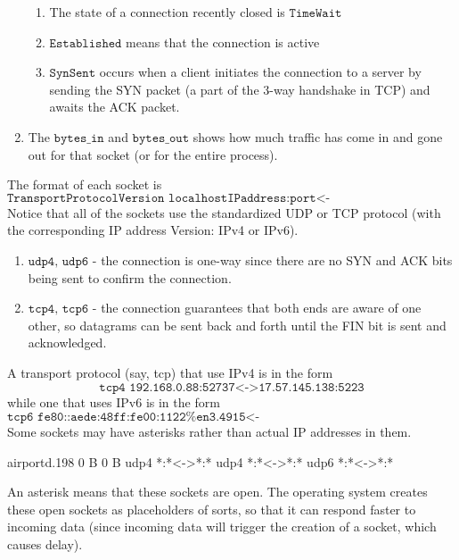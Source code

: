 \documentclass[a4paper, 12pt]{report}
\theoremstyle{remark}
\theoremstyle{definition}
\begin{document}
\begin{enumerate}
\begin{enumerate}
        \item The state of a connection recently closed is $\texttt{TimeWait}$ 
        \item $\texttt{Established}$ means that the connection is active
        \item $\texttt{SynSent}$ occurs when a client initiates the connection to a server by sending the SYN packet (a part of the 3-way handshake in TCP) and awaits the ACK packet. 
    \end{enumerate}
    \item The $\texttt{bytes\_in}$ and $\texttt{bytes\_out}$ shows how much traffic has come in and gone out for that socket (or for the entire process).
\end{enumerate}

The format of each socket is
\[\texttt{TransportProtocolVersion localhostIPaddress:port<->remoteIPaddress:port}\]
Notice that all of the sockets use the standardized UDP or TCP protocol (with the corresponding IP address Version: IPv4 or IPv6). 
\begin{enumerate}
    \item $\texttt{udp4, udp6}$ - the connection is one-way since there are no SYN and ACK bits being sent to confirm the connection. 
    \item $\texttt{tcp4, tcp6}$ - the connection guarantees that both ends are aware of one other, so datagrams can be sent back and forth until the FIN bit is sent and acknowledged. 
\end{enumerate}
A transport protocol (say, tcp) that use IPv4 is in the form
\[\texttt{tcp4 192.168.0.88:52737<->17.57.145.138:5223}\]
while one that uses IPv6 is in the form 
\[\texttt{tcp6 fe80::aede:48ff:fe00:1122\%en3.4915<->fe80::aede:48ff:fe33:445\%en3.5960}\]
Some sockets may have asterisks rather than actual IP addresses in them. 
\begin{python}
airportd.198                                              0 B        0 B
udp4 *:*<->*:*
udp4 *:*<->*:*
udp6 *:*<->*:*
\end{python}
An asterisk means that these sockets are open. The operating system creates these open sockets as placeholders of sorts, so that it can respond faster to incoming data (since incoming data will trigger the creation of a socket, which causes delay). 
\end{document}
